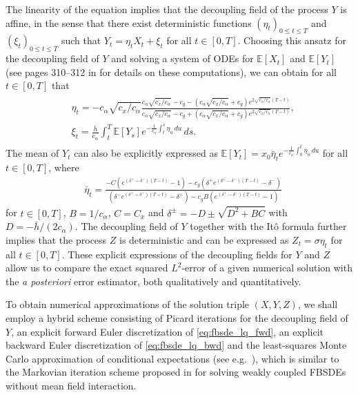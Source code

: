 \documentclass[11pt]{article}
\numberwithin{equation}{section}
\theoremstyle{definition}
\theoremstyle{remark}
\def\l{\label}  \def\f{\frac}  \def\fa{\forall}
\begin{document}
The linearity  of the equation implies that the decoupling field of the process $Y$ is affine,
in the sense that 
there exist deterministic functions
$(\eta_t)_{0 \leq t \leq T}$ and $(\xi_t)_{0 \leq t \leq T}$ such that 
$Y_t = \eta_t X_t + \xi_t$ for all $t\in [0,T]$.
Choosing this ansatz for the decoupling field of $Y$  and solving a system of ODEs for $\mathbb{E}[X_t]$ and $\mathbb{E}[Y_t]$ (see pages 310--312 in \cite{carmona2018a} for details on these computations), 
we can obtain for all $t\in [0,T]$ that  
\begin{align}\l{eq:decouple_lq}
\begin{split}
& \eta_t = - c_{\alpha} \sqrt{c_x/ c_{\alpha}} \frac{c_{\alpha} \sqrt{c_x/ c_{\alpha}} - c_g - (c_{\alpha} \sqrt{c_x/ c_{\alpha}} + c_g)e^{2 \sqrt{c_x/ c_{\alpha}}(T-t)}}{c_{\alpha} \sqrt{c_x/ c_{\alpha}} - c_g + (c_{\alpha} \sqrt{c_x/ c_{\alpha}} + c_g)e^{2 \sqrt{c_x/ c_{\alpha}}(T-t)}}, \\
& \xi_t = \frac{\bar{h}}{c_{\alpha}} \int_{t}^{T} \mathbb{E}[Y_s] e^{-\frac{1}{c_{\alpha}} \int_{t}^{s} \eta_u \, {d}u} \, {d}s.
\end{split}
\end{align}
The mean of $Y_t$ can  also be explicitly  expressed as
$\mathbb{E}[Y_t] = x_0 \bar{\eta}_t e^{- \frac{1}{c_{\alpha}}\int_{0}^{t} \bar{\eta}_u \, {d}u}$
for all $t \in [0,T]$,
where
\begin{align*}
& \bar{\eta}_t = \frac{-C \left( e^{(\delta^{+} - \delta^{-})(T-t)} -1 \right) - c_g \left( \delta^{+} e^{(\delta^{+} - \delta^{-})(T-t)} - \delta^{-} \right) }{\left( \delta^{-} e^{(\delta^{+} - \delta^{-})(T-t)} - \delta^{+} \right) - c_g B\left(e^{(\delta^{+} - \delta^{-})(T-t)} - 1 \right)}
\end{align*}
for $t\in [0,T]$,
$B={1}/{c_{\alpha}}$, $C=C_x$ and $\delta^{\pm}= -D \pm \sqrt{D^2+BC}$
with $D=-{\bar{h}}/{(2 c_{\alpha})}$.
The decoupling field of $Y$ together with  the It\^{o} formula 
further implies that the process $Z$ is  deterministic and can be expressed as 
$Z_t = \sigma \eta_t$ for all $t\in [0,T]$. 
These  explicit expressions of the decoupling fields for $Y$ and $Z$ allow us  to compare the exact squared $L^2$-error of  a given numerical solution with the \textit{a posteriori} error estimator, both qualitatively and quantitatively. 

To obtain numerical approximations of the solution triple $(X,Y,Z)$, we shall employ
a hybrid scheme consisting of  
 Picard iterations for the decoupling field of $Y$,
an explicit forward Euler discretization of \eqref{eq:fbsde_lq_fwd},
an explicit backward Euler discretization of \eqref{eq:fbsde_lq_bwd}
 and the least-squares Monte Carlo approximation of conditional expectations (see e.g.~\cite{gobet2006}),
 which is similar to  the Markovian iteration scheme proposed  in \cite{bender2008}
 for solving 
weakly coupled FBSDEs without mean field interaction.
\end{document}

